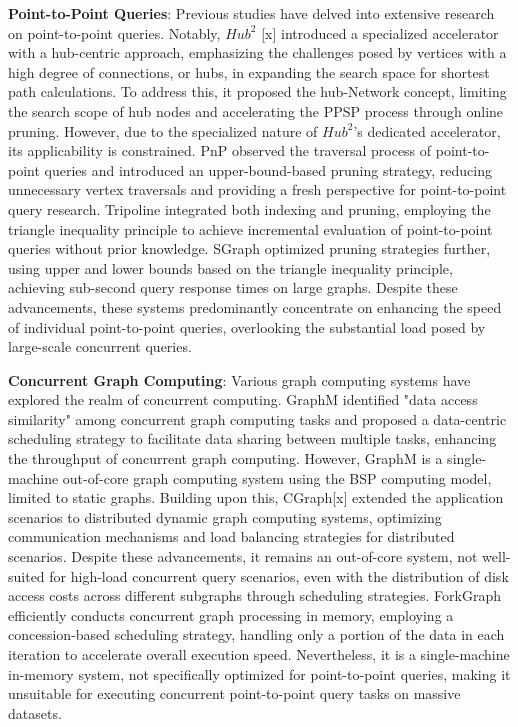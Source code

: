 \documentclass[lettersize,journal]{IEEEtran} %
\begin{document}
{\bf{Point-to-Point Queries}}: Previous studies have delved into extensive research on point-to-point queries. Notably, $Hub^2$ [x] introduced a specialized accelerator with a hub-centric approach, emphasizing the challenges posed by vertices with a high degree of connections, or hubs, in expanding the search space for shortest path calculations. To address this, it proposed the hub-Network concept, limiting the search scope of hub nodes and accelerating the PPSP process through online pruning. However, due to the specialized nature of $Hub^2$'s dedicated accelerator, its applicability is constrained. PnP observed the traversal process of point-to-point queries and introduced an upper-bound-based pruning strategy, reducing unnecessary vertex traversals and providing a fresh perspective for point-to-point query research. Tripoline integrated both indexing and pruning, employing the triangle inequality principle to achieve incremental evaluation of point-to-point queries without prior knowledge. SGraph optimized pruning strategies further, using upper and lower bounds based on the triangle inequality principle, achieving sub-second query response times on large graphs. Despite these advancements, these systems predominantly concentrate on enhancing the speed of individual point-to-point queries, overlooking the substantial load posed by large-scale concurrent queries.

{\bf{Concurrent Graph Computing}}: Various graph computing systems have explored the realm of concurrent computing. GraphM identified "data access similarity" among concurrent graph computing tasks and proposed a data-centric scheduling strategy to facilitate data sharing between multiple tasks, enhancing the throughput of concurrent graph computing. However, GraphM is a single-machine out-of-core graph computing system using the BSP computing model, limited to static graphs. Building upon this, CGraph[x] extended the application scenarios to distributed dynamic graph computing systems, optimizing communication mechanisms and load balancing strategies for distributed scenarios. Despite these advancements, it remains an out-of-core system, not well-suited for high-load concurrent query scenarios, even with the distribution of disk access costs across different subgraphs through scheduling strategies. ForkGraph efficiently conducts concurrent graph processing in memory, employing a concession-based scheduling strategy, handling only a portion of the data in each iteration to accelerate overall execution speed. Nevertheless, it is a single-machine in-memory system, not specifically optimized for point-to-point queries, making it unsuitable for executing concurrent point-to-point query tasks on massive datasets.
\end{document}
